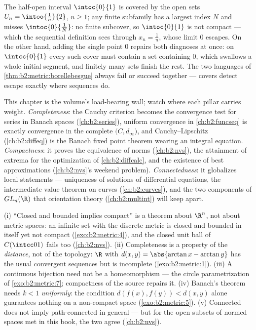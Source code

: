 \begin{example}\label{ex:b2:metric:covers}
The half-open interval $\intoc{0}{1}$ is covered by the open sets
$U_n = \intoo{\frac1n}{2}$, $n \geq 1$; any finite subfamily has a
largest index $N$ and misses $\intoc{0}{\frac1N}$: no finite
subcover, so $\intoc{0}{1}$ is not compact --- which the
sequential definition sees through $x_n = \frac1n$, whose limit
$0$ escapes. On the other hand, adding the single point $0$
repairs both diagnoses at once: on $\intcc{0}{1}$ every such cover
must contain a set containing $0$, which swallows a whole initial
segment, and finitely many sets finish the rest. The two languages
of \cref{thm:b2:metric:borellebesgue} always fail or succeed
together --- covers detect escape exactly where sequences do.
\end{example}

\begin{remark}\label{rem:b2:metric:perspectives}
This chapter is the volume's load-bearing wall; watch where
each pillar carries weight. \emph{Completeness}: the Cauchy
criterion becomes the convergence test for series in Banach
spaces (\cref{ch:b2:series}), uniform convergence in
\cref{ch:b2:funcseq} is exactly convergence in the complete
$\bigl(C, d_\infty\bigr)$, and Cauchy--Lipschitz
(\cref{ch:b2:diffeq}) is the Banach fixed point theorem wearing
an integral equation. \emph{Compactness}: it proves the
equivalence of norms (\cref{ch:b2:nvs}), the attainment of
extrema for the optimization of \cref{ch:b2:diffcalc}, and the
existence of best approximations (\cref{ch:b2:nvs}'s weekend
problem). \emph{Connectedness}: it globalizes local statements
--- uniqueness of solutions of differential equations, the
intermediate value theorem on curves (\cref{ch:b2:curves}), and
the two components of $GL_n(\R)$ that orientation theory
(\cref{ch:b2:multint}) will keep apart.
\end{remark}

\begin{remark}\label{rem:b2:metric:pitfalls}
(i) ``Closed and bounded implies compact'' is a theorem about
$\R^n$, not about metric spaces: an infinite set with the
discrete metric is closed and bounded in itself yet not compact
(\cref{exo:b2:metric:4}), and the closed unit ball of
$C(\intcc01)$ fails too (\cref{ch:b2:nvs}). (ii) Completeness is
a property of the \emph{distance}, not of the topology: $\R$
with $d(x,y) = \abs{\arctan x - \arctan y}$ has the usual
convergent sequences but is incomplete
(\cref{exo:b2:metric:1}). (iii) A continuous bijection need not
be a homeomorphism --- the circle parametrization of
\cref{exo:b2:metric:7}; compactness of the source repairs it.
(iv) Banach's theorem needs $k < 1$ \emph{uniformly}: the
condition $d(f(x), f(y)) < d(x,y)$ alone guarantees nothing on a
non-compact space (\cref{exo:b2:metric:5}). (v) Connected does
not imply path-connected in general --- but for the open
subsets of normed spaces met in this book, the two agree
(\cref{ch:b2:nvs}).
\end{remark}


